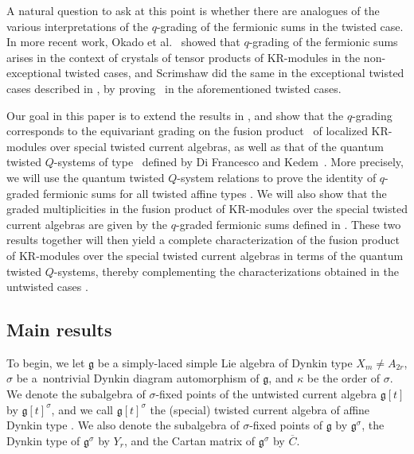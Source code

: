 \documentclass[10pt,a4paper]{amsart}
\numberwithin{equation}{section}
\begin{document}
A natural question to ask at this point is whether there are analogues of the various interpretations of the $q$-grading of the fermionic sums \cite[equations~(4.5) and (4.20)]{HKOTT02} in the twisted case. In more recent work, Okado et al.\ \cite{OSS18} showed that $q$-grading of the fermionic sums arises in the context of crystals of tensor products of KR-modules in the non-exceptional twisted cases, and Scrimshaw did the same in the exceptional twisted cases described in \cite{Scrimshaw16, Scrimshaw20}, by proving~\cite[Conjecture~3.10]{HKOTT02} in the aforementioned twisted cases.

Our goal in this paper is to extend the results in \cite{AK07, DFK14, Lin21}, and show that the $q$-grading corresponds to the equivariant grading on the fusion product~\cite{KV16} of localized KR-modules over special twisted current algebras, as well as that of the quantum twisted $Q$-systems of type~ defined by Di Francesco and Kedem~\cite{DFK24}. More precisely, we will use the quantum twisted $Q$-system relations to prove the identity \cite[Conjecture~4.3]{HKOTT02} of $q$-graded fermionic sums for all twisted affine types . We will also show that the graded multiplicities in the fusion product of KR-modules over the special twisted current algebras are given by the $q$-graded fermionic sums defined in \cite[equation~(4.5)]{HKOTT02}. These two results together will then yield a complete characterization of the fusion product of KR-modules over the special twisted current algebras in terms of the quantum twisted $Q$-systems, thereby complementing the characterizations obtained in the untwisted cases \cite{DFK14, Lin21}.

\subsection{Main results}\label{Section 1.2}

To begin, we let $\mathfrak{g}$ be a simply-laced simple Lie algebra of Dynkin type $X_m\neq A_{2r}$, $\sigma$ be a~nontrivial Dynkin diagram automorphism of $\mathfrak{g}$, and $\kappa$ be the order of $\sigma$. We denote the subalgebra of $\sigma$-fixed points of the untwisted current algebra $\mathfrak{g}[t]$ by $\mathfrak{g}[t]^{\sigma}$, and we call $\mathfrak{g}[t]^{\sigma}$ the (special) \cite[Section 1.5]{KV16} twisted current algebra of affine Dynkin type . We also denote the subalgebra of $\sigma$-fixed points of $\mathfrak{g}$ by $\mathfrak{g}^{\sigma}$, the Dynkin type of $\mathfrak{g}^{\sigma}$ by $Y_r$, and the Cartan matrix of $\mathfrak{g}^{\sigma}$ by $\overline{C}$.
\end{document}
